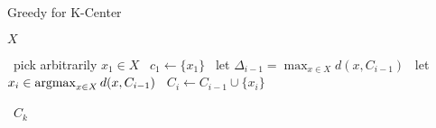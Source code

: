 \begin{algorithm}
    \caption{Greedy for K-Center}\label{alg:greedy_k_center}
    \begin{algorithmic}%
                \State\Return $X$
            \EndIf
            
            \State~pick arbitrarily $x_1 \in X$
            \State~$c_1 \gets \{ x_1 \}$
                \State~let $\Delta_{i-1} = \max_{x \in X} d(x, C_{i-1})$
                \State~let $x_i \in \operatorname*{argmax}_{x \in X} d(x, C_{i-1})$
                \State~$C_i \gets C_{i-1} \cup \{x_i\}$
            \EndFor
            
            \Return~$C_k$
        \EndProcedure
    \end{algorithmic}
\end{algorithm}